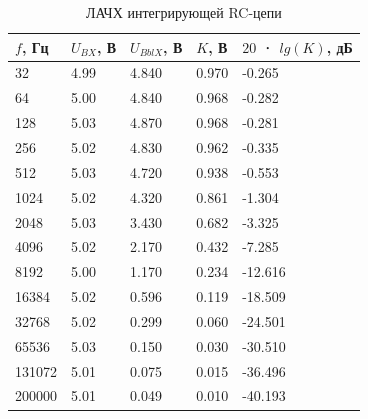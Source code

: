 \begin{table}[H]
	\begin{center}
	\caption{ЛАЧХ интегрирующей RC-цепи}
	\def\arraystretch{1.5}
		\begin{tabularx}{\textwidth}{|X|X|X|X|X|}
			\hline
			$f$, Гц & $U_{BX}$, В & $U_{BblX}$, В & $K$, В & $20$ · $lg(K)$, дБ\\\hline
			32 & 4.99 & 4.840 & 0.970 & -0.265\\\hline
			64 & 5.00 & 4.840 & 0.968 & -0.282\\\hline
			128 & 5.03 & 4.870 & 0.968 & -0.281\\\hline
			256 & 5.02 & 4.830 & 0.962 & -0.335\\\hline
			512 & 5.03 & 4.720 & 0.938 & -0.553\\\hline
			1024 & 5.02 & 4.320 & 0.861 & -1.304\\\hline
			2048 & 5.03 & 3.430 & 0.682 & -3.325\\\hline
			4096 & 5.02 & 2.170 & 0.432 & -7.285\\\hline
			8192 & 5.00 & 1.170 & 0.234 & -12.616\\\hline
			16384 & 5.02 & 0.596 & 0.119 & -18.509\\\hline
			32768 & 5.02 & 0.299 & 0.060 & -24.501\\\hline
			65536 & 5.03 & 0.150 & 0.030 & -30.510\\\hline
			131072 & 5.01 & 0.075 & 0.015 & -36.496\\\hline
			200000 & 5.01 & 0.049 & 0.010 & -40.193\\\hline			
		\end{tabularx}
		\label{tabular:2}
	\end{center}
\end{table}

